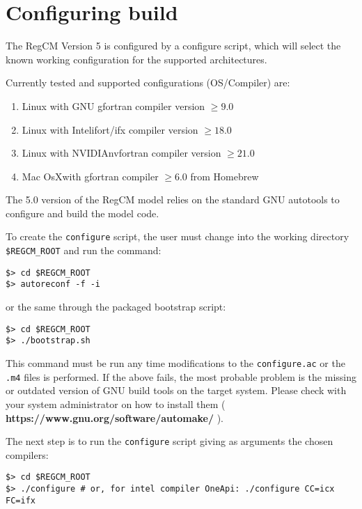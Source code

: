 \section{Configuring build}

The RegCM Version 5 is configured by a configure script, which will select
the known working configuration for the supported architectures.

Currently tested and supported configurations (OS/Compiler) are:

\begin{enumerate}
\item Linux with GNU gfortran compiler version $\ge 9.0$
\item Linux with Intel\texttrademark ifort/ifx compiler version $\ge 18.0$
\item Linux with NVIDIA\texttrademark nvfortran compiler version $\ge 21.0$
\item Mac OsX\texttrademark with gfortran compiler $\ge 6.0$ from Homebrew
\end{enumerate}

The 5.0 version of the RegCM model relies on the standard GNU autotools to
configure and build the model code.

To create the \verb=configure= script, the user must change into the 
working directory \verb=$REGCM_ROOT= and run the command:

\begin{Verbatim}
$> cd $REGCM_ROOT
$> autoreconf -f -i
\end{Verbatim}

or the same through the packaged bootstrap script:

\begin{Verbatim}
$> cd $REGCM_ROOT
$> ./bootstrap.sh
\end{Verbatim}

This command must be run any time modifications to the \verb=configure.ac= or
the \verb=.m4= files is performed.
If the above fails, the most probable problem is the missing or outdated
version of GNU build tools on the target system. Please check with your
system administrator on how to install them
({ \bf https://www.gnu.org/software/automake/ }).

The next step is to run the \verb=configure= script giving as arguments the
chosen compilers:

\begin{Verbatim}
$> cd $REGCM_ROOT
$> ./configure # or, for intel compiler OneApi: ./configure CC=icx FC=ifx
\end{Verbatim}

